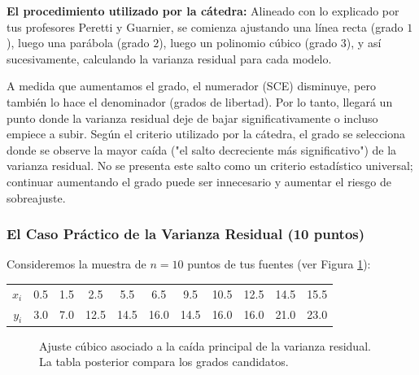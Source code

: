 \documentclass[11pt,a4paper]{article}
\begin{document}
    \textbf{El procedimiento utilizado por la cátedra:}
    Alineado con lo explicado por tus profesores Peretti y Guarnier, se comienza ajustando una línea recta (grado $1$), luego una parábola (grado $2$), luego un polinomio cúbico (grado $3$), y así sucesivamente, calculando la varianza residual para cada modelo.
    
    A medida que aumentamos el grado, el numerador (SCE) disminuye, pero también lo hace el denominador (grados de libertad). Por lo tanto, llegará un punto donde la varianza residual deje de bajar significativamente o incluso empiece a subir. Según el criterio utilizado por la cátedra, el grado se selecciona donde se observe la mayor caída ("el salto decreciente más significativo") de la varianza residual. No se presenta este salto como un criterio estadístico universal; continuar aumentando el grado puede ser innecesario y aumentar el riesgo de sobreajuste.

    \subsubsection*{El Caso Práctico de la Varianza Residual (10 puntos)}
    Consideremos la muestra de $n = 10$ puntos de tus fuentes (ver Figura \ref{fig:residual}):
    \begin{table}[h!]
        \centering
        \begin{tabular}{rcccccccccc}
            \toprule
            \textbf{$x_i$} & 0.5 & 1.5 & 2.5 & 5.5 & 6.5 & 9.5 & 10.5 & 12.5 & 14.5 & 15.5 \\
            \textbf{$y_i$} & 3.0 & 7.0 & 12.5 & 14.5 & 16.0 & 14.5 & 16.0 & 16.0 & 21.0 & 23.0 \\
            \bottomrule
        \end{tabular}
    \end{table}

    \begin{figure}[htbp]
        \centering
        \caption{Ajuste cúbico asociado a la caída principal de la varianza residual. La tabla posterior compara los grados candidatos.}
        \label{fig:residual}
    \end{figure}
\end{document}
